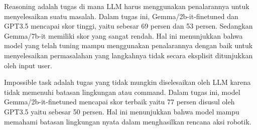 Reasoning adalah tugas di mana LLM harus menggunakan penalarannya untuk menyelesaikan suatu masalah. Dalam tugas ini, Gemma/2b-it-finetuned dan GPT3.5 mencapai skor tinggi, yaitu sebesar 69 persen dan 53 persen. Sedangkan Gemma/7b-it memiliki skor yang sangat rendah. Hal ini menunjukkan bahwa model yang telah tuning mampu menggunakan penalarannya dengan baik untuk menyelesaikan permasalahan yang langkahnya tidak secara eksplisit ditunjukkan oleh input user.

Impossible task adalah tugas yang tidak mungkin diselesaikan oleh LLM karena tidak memenuhi batasan lingkungan atau command. Dalam tugas ini, model Gemma/2b-it-finetuned mencapai skor terbaik yaitu 77 persen disusul oleh GPT3.5 yaitu sebesar 50 persen. Hal ini menunjukkan bahwa model mampu memahami batasan lingkungan nyata dalam menghasilkan rencana aksi robotik.

